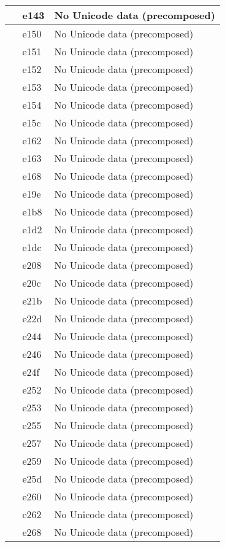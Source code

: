 \documentclass[12pt,letterpaper,openany]{book}
\begin{document}
\begin{center}
\begin{supertabular}{|m{0.25in}|m{0.5in}|m{4in}|}
 & e143 & No Unicode data (precomposed)\\\hline
 & e150 & No Unicode data (precomposed)\\\hline
 & e151 & No Unicode data (precomposed)\\\hline
 & e152 & No Unicode data (precomposed)\\\hline
 & e153 & No Unicode data (precomposed)\\\hline
 & e154 & No Unicode data (precomposed)\\\hline
 & e15c & No Unicode data (precomposed)\\\hline
 & e162 & No Unicode data (precomposed)\\\hline
 & e163 & No Unicode data (precomposed)\\\hline
 & e168 & No Unicode data (precomposed)\\\hline
 & e19e & No Unicode data (precomposed)\\\hline
 & e1b8 & No Unicode data (precomposed)\\\hline
 & e1d2 & No Unicode data (precomposed)\\\hline
 & e1dc & No Unicode data (precomposed)\\\hline
 & e208 & No Unicode data (precomposed)\\\hline
 & e20c & No Unicode data (precomposed)\\\hline
 & e21b & No Unicode data (precomposed)\\\hline
 & e22d & No Unicode data (precomposed)\\\hline
 & e244 & No Unicode data (precomposed)\\\hline
 & e246 & No Unicode data (precomposed)\\\hline
 & e24f & No Unicode data (precomposed)\\\hline
 & e252 & No Unicode data (precomposed)\\\hline
 & e253 & No Unicode data (precomposed)\\\hline
 & e255 & No Unicode data (precomposed)\\\hline
 & e257 & No Unicode data (precomposed)\\\hline
 & e259 & No Unicode data (precomposed)\\\hline
 & e25d & No Unicode data (precomposed)\\\hline
 & e260 & No Unicode data (precomposed)\\\hline
 & e262 & No Unicode data (precomposed)\\\hline
 & e268 & No Unicode data (precomposed)\\\hline

\end{supertabular}
\end{center}
\end{document}
